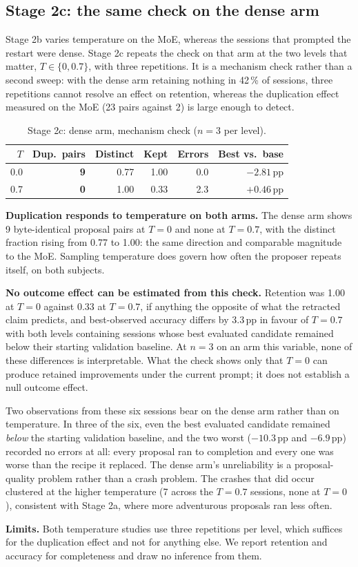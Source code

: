 \subsection{Stage 2c: the same check on the dense arm}\label{sec:results:dense-temp}

Stage 2b varies temperature on the MoE, whereas the sessions that prompted the
restart were dense. Stage 2c repeats the check on that arm at the two levels that
matter, $T \in \{0, 0.7\}$, with three repetitions. It is a mechanism check
rather than a second sweep: with the dense arm retaining nothing in 42\,\% of
sessions, three repetitions cannot resolve an effect on retention, whereas the
duplication effect measured on the MoE (23 pairs against 2) is large enough to
detect.

\begin{table}[htbp]
\centering
\caption{Stage 2c: dense arm, mechanism check ($n=3$ per level).}
\label{tab:dense-temp}
\small
\begin{tabular}{rrrrrr}
\toprule
$T$ & Dup.\ pairs & Distinct & Kept & Errors & Best vs.\ base \\
\midrule
0.0 & \textbf{9} & 0.77 & 1.00 & 0.0 & $-2.81$\,pp \\
0.7 & \textbf{0} & 1.00 & 0.33 & 2.3 & $+0.46$\,pp \\
\bottomrule
\end{tabular}
\end{table}

\textbf{Duplication responds to temperature on both arms.} The dense arm shows
9 byte-identical proposal pairs at $T=0$ and none at $T=0.7$, with the distinct
fraction rising from 0.77 to 1.00: the same direction and comparable magnitude to
the MoE. Sampling temperature does govern how often the proposer repeats itself,
on both subjects.

\textbf{No outcome effect can be estimated from this check.} Retention was 1.00 at $T=0$ against
0.33 at $T=0.7$, if anything the opposite of what the retracted claim predicts,
and best-observed accuracy differs by 3.3\,pp in favour of $T=0.7$ with both
levels containing sessions whose best evaluated candidate remained below their
starting validation baseline. At $n=3$ on an
arm this variable, none of these differences is interpretable. What the check
shows only that $T=0$ can produce retained improvements under the current prompt;
it does not establish a null outcome effect.

Two observations from these six sessions bear on the dense arm rather than on
temperature. In three of the six, even the best evaluated candidate remained
\emph{below} the starting validation baseline, and the
two worst ($-10.3$\,pp and $-6.9$\,pp) recorded no errors at all: every proposal
ran to completion and every one was worse than the recipe it replaced. The dense
arm's unreliability is a proposal-quality problem rather than a crash problem.
The crashes that did occur clustered at the higher temperature (7 across the
$T=0.7$ sessions, none at $T=0$), consistent with Stage 2a, where more
adventurous proposals ran less often.

\textbf{Limits.} Both temperature studies use three repetitions per level, which
suffices for the duplication effect and not for anything else. We report
retention and accuracy for completeness and draw no inference from them.

